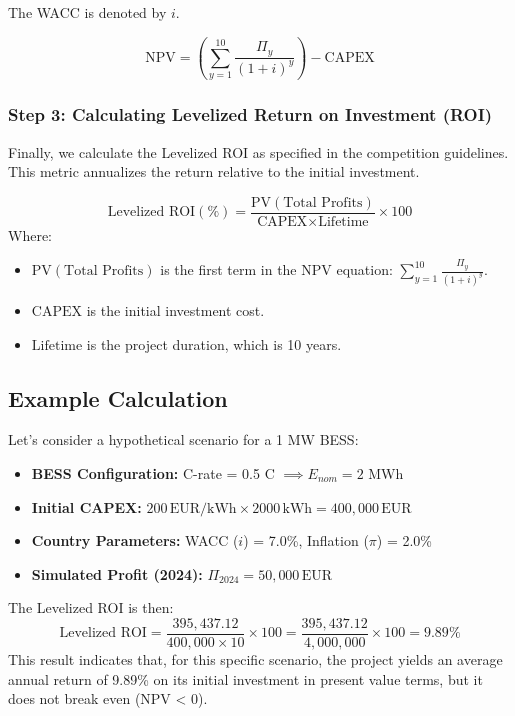 The WACC is denoted by $i$.

\begin{equation}
\text{NPV} = \left( \sum_{y=1}^{10} \frac{\Pi_y}{(1 + i)^y} \right) - \text{CAPEX}
\end{equation}

\subsubsection{Step 3: Calculating Levelized Return on Investment (ROI)}
Finally, we calculate the Levelized ROI as specified in the competition guidelines. This metric annualizes the return relative to the initial investment.

\begin{equation}
\text{Levelized ROI} (\%) = \frac{\text{PV}(\text{Total Profits})}{\text{CAPEX} \times \text{Lifetime}} \times 100
\end{equation}
Where:
\begin{itemize}
    \item $\text{PV}(\text{Total Profits})$ is the first term in the NPV equation: $\sum_{y=1}^{10} \frac{\Pi_y}{(1 + i)^y}$.
    \item $\text{CAPEX}$ is the initial investment cost.
    \item $\text{Lifetime}$ is the project duration, which is 10 years.
\end{itemize}

\subsection{Example Calculation}
Let's consider a hypothetical scenario for a 1 MW BESS:
\begin{itemize}
    \item \textbf{BESS Configuration:} C-rate = 0.5 C $\implies E_{nom} = 2$ MWh
    \item \textbf{Initial CAPEX:} $200 \, \text{EUR/kWh} \times 2000 \, \text{kWh} = 400,000 \, \text{EUR}$
    \item \textbf{Country Parameters:} WACC ($i$) = 7.0\%, Inflation ($\pi$) = 2.0\%
    \item \textbf{Simulated Profit (2024):} $\Pi_{2024} = 50,000 \, \text{EUR}$
\end{itemize}


The Levelized ROI is then:
\[
\text{Levelized ROI} = \frac{395,437.12}{400,000 \times 10} \times 100 = \frac{395,437.12}{4,000,000} \times 100 = 9.89\%
\]
This result indicates that, for this specific scenario, the project yields an average annual return of 9.89\% on its initial investment in present value terms, but it does not break even (NPV < 0).
